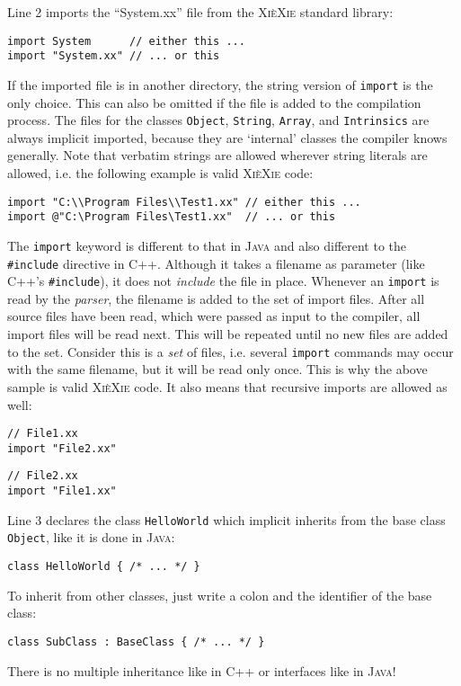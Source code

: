 \documentclass{report}
\def\xiexie{\textsc{Xi\`eXie}\xspace}
\def\cpp{\textsc{C++}\xspace}
\def\java{\textsc{Java}\xspace}
\begin{document}
Line 2 imports the ``System.xx'' file from the \xiexie standard library:
\begin{lstlisting}
import System      // either this ...
import "System.xx" // ... or this
\end{lstlisting}
If the imported file is in another directory, the string version of \texttt{import} is the only choice.
This can also be omitted if the file is added to the compilation process.
The files for the classes \texttt{Object}, \texttt{String}, \texttt{Array}, and \texttt{Intrinsics}
are always implicit imported, because they are `internal' classes the compiler knows generally.
Note that verbatim strings are allowed wherever string literals are allowed, i.e. the following example is valid \xiexie code:
\begin{lstlisting}
import "C:\\Program Files\\Test1.xx" // either this ...
import @"C:\Program Files\Test1.xx"  // ... or this
\end{lstlisting}
The \texttt{import} keyword is different to that in \java and also different to the \texttt{\#include} directive in \cpp.
Although it takes a filename as parameter (like \cpp's \texttt{\#include}), it does not \textit{include} the file in place.
Whenever an \texttt{import} is read by the \textit{parser}, the filename is added to the set of import files.
After all source files have been read, which were passed as input to the compiler, all import files will be read next.
This will be repeated until no new files are added to the set.
Consider this is a \textit{set} of files, i.e. several \texttt{import} commands may occur with the same filename,
but it will be read only once. This is why the above sample is valid \xiexie code. It also means that recursive imports
are allowed as well:
\begin{lstlisting}
// File1.xx
import "File2.xx"
\end{lstlisting}
\begin{lstlisting}
// File2.xx
import "File1.xx"
\end{lstlisting}

Line 3 declares the class \texttt{HelloWorld} which implicit inherits from the base class \texttt{Object},
like it is done in \java:
\begin{lstlisting}
class HelloWorld { /* ... */ }
\end{lstlisting}
To inherit from other classes, just write a colon and the identifier of the base class:
\begin{lstlisting}
class SubClass : BaseClass { /* ... */ }
\end{lstlisting}
There is no multiple inheritance like in \cpp or interfaces like in \java!
\end{document}
